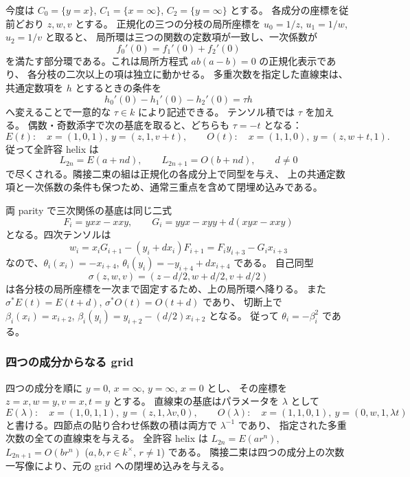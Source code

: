 今度は $C_0=\{y=x\}$, $C_1=\{x=\infty\}$, $C_2=\{y=\infty\}$ とする。
各成分の座標を従前どおり $z,w,v$ とする。
正規化の三つの分枝の局所座標を $u_0=1/z$, $u_1=1/w$, $u_2=1/v$ と取ると、
局所環は三つの関数の定数項が一致し、一次係数が
\[
 f_0'(0)=f_1'(0)+f_2'(0)
\]
を満たす部分環である。これは局所方程式 $ab(a-b)=0$ の正規化表示であり、
各分枝の二次以上の項は独立に動かせる。
多重次数を指定した直線束は、共通定数項を $h$ とするときの条件を
\[
 h_0'(0)-h_1'(0)-h_2'(0)=\tau h
\]
へ変えることで一意的な $\tau\in k$ により記述できる。
テンソル積では $\tau$ を加える。
偶数・奇数添字で次の基底を取ると、どちらも $\tau=-t$ となる：
\[
 E(t):\quad x=(1,0,1),\ y=(z,1,v+t),
 \qquad
 O(t):\quad x=(1,1,0),\ y=(z,w+t,1).
\]
従って全許容 helix は
\[
 L_{2n}=E(a+nd),\qquad L_{2n+1}=O(b+nd),\qquad d\ne0
\]
で尽くされる。隣接二束の組は正規化の各成分上で同型を与え、
上の共通定数項と一次係数の条件も保つため、通常三重点を含めて閉埋め込みである。

両 parity で三次関係の基底は同じ二式
\[
 F_i=yxx-xxy,\qquad
 G_i=yyx-xyy+d(xyx-xxy)
\]
となる。四次テンソルは
\[
 w_i=x_iG_{i+1}-(y_i+dx_i)F_{i+1}
     =F_i y_{i+3}-G_i x_{i+3}
\]
なので、$\theta_i(x_i)=-x_{i+4}$,
$\theta_i(y_i)=-y_{i+4}+dx_{i+4}$ である。
自己同型
\[
 \sigma(z,w,v)=(z-d/2,w+d/2,v+d/2)
\]
は各分枝の局所座標を一次まで固定するため、上の局所環へ降りる。
また $\sigma^*E(t)=E(t+d)$, $\sigma^*O(t)=O(t+d)$ であり、
切断上で $\beta_i(x_i)=x_{i+2}$,
$\beta_i(y_i)=y_{i+2}-(d/2)x_{i+2}$ となる。
従って $\theta_i=-\beta_i^2$ である。

\subsubsection{四つの成分からなる grid}

四つの成分を順に $y=0$, $x=\infty$, $y=\infty$, $x=0$ とし、
その座標を $z=x,w=y,v=x,t=y$ とする。
直線束の基底はパラメータを $\lambda$ として
\[
 E(\lambda):\quad x=(1,0,1,1),\ y=(z,1,\lambda v,0),
 \qquad
 O(\lambda):\quad x=(1,1,0,1),\ y=(0,w,1,\lambda t)
\]
と書ける。四節点の貼り合わせ係数の積は両方で $\lambda^{-1}$ であり、
指定された多重次数の全ての直線束を与える。
全許容 helix は $L_{2n}=E(ar^n)$,
$L_{2n+1}=O(br^n)$ ($a,b,r\in k^\times$, $r\ne1$) である。
隣接二束は四つの成分上の次数一写像により、元の grid への閉埋め込みを与える。

